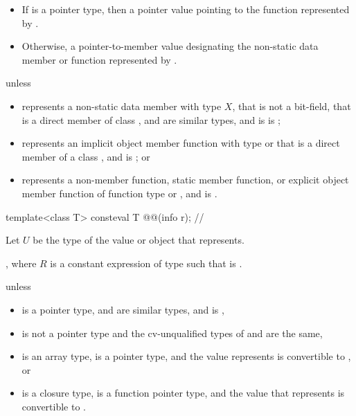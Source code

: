 \begin{itemdescr}
\pnum
\returns
\begin{itemize}
\item
  If  is a pointer type,
  then a pointer value pointing to the function represented by .
\item
  Otherwise, a pointer-to-member value
  designating the non-static data member or function represented by .
\end{itemize}

\pnum
\throws
{} unless
\begin{itemize}
\item
   represents a non-static data member with type $X$,
  that is not a bit-field,
  that is a direct member of class ,
   and  are similar types, and
   is  is ;
\item
   represents an implicit object member function
  with type  or 
  that is a direct member of a class ,
  and  is ; or
\item
   represents a non-member function,
  static member function, or
  explicit object member function
  of function type  or ,
  and  is .
\end{itemize}
\end{itemdescr}

\begin{itemdecl}
template<class T>
  consteval T @@(info r);    // \expos
\end{itemdecl}

\begin{itemdescr}
\pnum
Let $U$ be the type of the value or object that  represents.

\pnum
\returns
{},
where $R$ is a constant expression of type 
such that  is .

\pnum
\throws
{} unless
\begin{itemize}
\item
   is a pointer type,
   and  are similar types, and
   is ,
\item
   is not a pointer type
  and the cv-unqualified types of  and  are the same,
\item
   is an array type,
   is a pointer type, and
  the value  represents is convertible to , or
\item
   is a closure type,
   is a function pointer type, and
  the value that  represents is convertible to .
\end{itemize}
\end{itemdescr}

